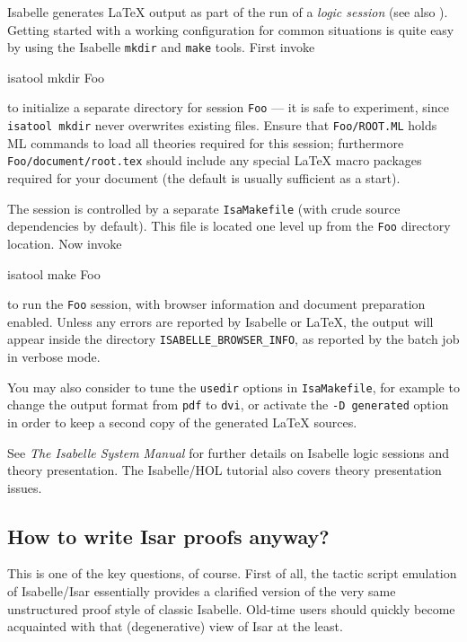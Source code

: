 Isabelle generates {\LaTeX} output as part of the run of a \emph{logic
  session} (see also \cite{isabelle-sys}).  Getting started with a working
configuration for common situations is quite easy by using the Isabelle
\texttt{mkdir} and \texttt{make} tools.  First invoke
\begin{ttbox}
  isatool mkdir Foo
\end{ttbox}
to initialize a separate directory for session \texttt{Foo} --- it is safe to
experiment, since \texttt{isatool mkdir} never overwrites existing files.
Ensure that \texttt{Foo/ROOT.ML} holds ML commands to load all theories
required for this session; furthermore \texttt{Foo/document/root.tex} should
include any special {\LaTeX} macro packages required for your document (the
default is usually sufficient as a start).

The session is controlled by a separate \texttt{IsaMakefile} (with crude
source dependencies by default).  This file is located one level up from the
\texttt{Foo} directory location.  Now invoke
\begin{ttbox}
  isatool make Foo
\end{ttbox}
to run the \texttt{Foo} session, with browser information and document
preparation enabled.  Unless any errors are reported by Isabelle or {\LaTeX},
the output will appear inside the directory \texttt{ISABELLE_BROWSER_INFO}, as
reported by the batch job in verbose mode.

\medskip

You may also consider to tune the \texttt{usedir} options in
\texttt{IsaMakefile}, for example to change the output format from
\texttt{pdf} to \texttt{dvi}, or activate the \texttt{-D generated} option in
order to keep a second copy of the generated {\LaTeX} sources.

\medskip

See \emph{The Isabelle System Manual} \cite{isabelle-sys} for further details
on Isabelle logic sessions and theory presentation.  The Isabelle/HOL tutorial
\cite{isabelle-hol-book} also covers theory presentation issues.


\subsection{How to write Isar proofs anyway?}\label{sec:isar-howto}

This is one of the key questions, of course.  First of all, the tactic script
emulation of Isabelle/Isar essentially provides a clarified version of the
very same unstructured proof style of classic Isabelle.  Old-time users should
quickly become acquainted with that (degenerative) view of Isar at the least.

